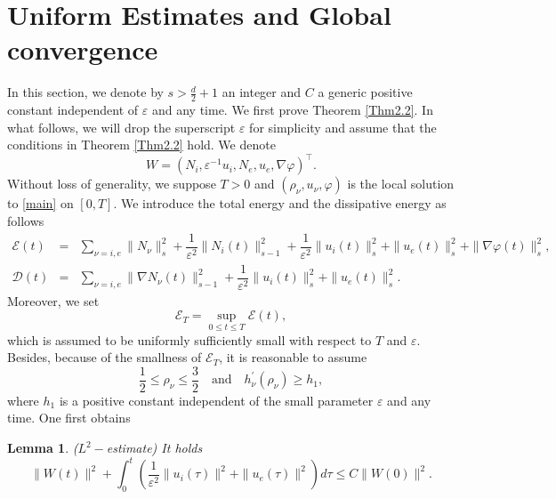 \documentclass[reqno,twoside,12pt,a4paper]{amsart}
\newcommand{\eps}{\mathbb{\varepsilon}}
\newcommand{\D}{\nabla}
\newcommand{\vp}{\varphi}
\newtheorem{lemma}{Lemma}[section]
\numberwithin{equation}{section}
\begin{document}
\section{Uniform Estimates and Global convergence}
In this section, we denote by $s> \frac{d}{2}+1$ an integer and $ C $  a generic positive constant independent of $ \eps $ and any time. We first prove Theorem \ref{Thm2.2}. In what follows, we will drop the superscript $\eps$ for simplicity and assume that the conditions in Theorem \ref{Thm2.2} hold. We denote
\[
 W=\left(
N_i,\eps^{-1}u_i,N_e,u_e,\D\vp\right)^\top.
\]
Without loss of generality, we suppose $T>0$ and $(\rho_\nu,u_\nu,\vp)$ is the local solution to \eqref{main} on $[0,T]$. We introduce the total energy and the dissipative energy as follows
\begin{eqnarray*}
\mathscr{E}(t)&=&\sum_{\nu=i,e}\|N_\nu\|_s^2+\dfrac{1}{\eps^2}\|N_i(t)\|_{s-1}^2+\dfrac{1}{\eps^2}\|u_i(t)\|_s^2
+\|u_e(t)\|_s^2+\|\D \vp(t)\|_s^2,\\
\mathscr{D}(t)&=&\sum_{\nu=i,e}\|\nabla N_\nu(t)\|_{s-1}^2+\dfrac{1}{\eps^2}\|u_i(t)\|_s^2+\|u_e(t)\|_{s}^2.
\end{eqnarray*}
Moreover, we set
\begin{equation*}\label{totalenergy}
\mathscr{E}_T=\sup_{0\leq t\leq T}\mathscr{E}(t),
\end{equation*}
which is assumed to be uniformly sufficiently small with respect to $T$ and $\eps$. Besides, because of the smallness of $\mathscr{E}_T$, it is reasonable to assume
\begin{equation}\label{lowerboundrho}
 \dfrac{1}{2}\leq \rho_\nu \leq \dfrac{3}{2} \quad  \text{and}\quad  h_\nu^\prime(\rho_\nu)\geq h_1,
\end{equation}
where $h_1$ is a positive constant independent of the small parameter $\eps$ and any time. One first obtains
\begin{lemma}($L^2-$estimate) It holds
\begin{equation}\label{L2estim}
\|W(t)\|^2+\int_0^t\left(\dfrac{1}{\eps^2}\|u_i(\tau)\|^2+\|u_e(\tau)\|^2\right)d\tau\leq C\|W(0)\|^2.
\end{equation}
\end{lemma}
\end{document}
